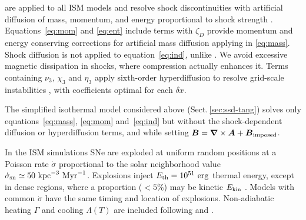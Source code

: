 \documentclass[preprint2]{aastex63}
\newcommand\SNr{\dot\sigma_{\rm sn}}
\newcommand\ESK{E_{\rm kin}}
\newcommand\EST{E_{\rm th}}
\newcommand{\vect}[1]{{{\mbox{\boldmath $#1$}}}}%
\newcommand\kpc{~ {\rm kpc}}
\newcommand\dx{ {\delta x}}
\newcommand\Myr{~ {\rm Myr}}
\newcommand\erg{~ {\rm erg}}
\newcommand{\fg}[1]{\textcolor{midgreen}{#1}}
\begin{document}
 \fg{are applied to all ISM models and} resolve shock
 discontinuities with artificial diffusion of mass, momentum, and energy
 proportional to shock strength \citep[see][for details]{GMKSH20}.
 \fg{Equations~\eqref{eq:mom} and \eqref{eq:ent} include terms with $\zeta_D$
 provide momentum and energy conserving corrections for artificial mass
 diffusion applying in \eqref{eq:mass}.}
 Shock diffusion is not applied to equation~\eqref{eq:ind}\fg{, unlike
 \citet{Gent:2013b}. We avoid excessive magnetic dissipation in
 shocks, where compression actually enhances it.}
 Terms containing $\nu_3,\,\chi_3$ and $\eta_3$ apply sixth-order hyperdiffusion
 to resolve grid-scale instabilities \citep[see, e.g.,][]{ABGS02,HB04}, \fg{
 with coefficients optimal for each $\dx$}.

 \fg{The simplified isothermal model considered above
 (Sect.\,\ref{sec:ssd-tang}) solves only
 equations~\fg{\eqref{eq:mass},} \eqref{eq:mom} and~\eqref{eq:ind} but 
 without the
 shock-dependent diffusion or hyperdiffusion terms, and while setting
 $\vect{B}=\vect\nabla\times\vect{A}+\vect{B}_{\rm imposed}$.}

 \fg{In the ISM simulations} SNe are exploded at \fg{uniform} random positions
 at a Poisson rate $\dot\sigma$ \fg{proportional to} the solar neighborhood
 value $\SNr\simeq 50\kpc^{-3}\Myr^{-1}$.
 Explosions inject $\EST = 10^{51}\erg$ thermal energy, except in
 dense regions, where a proportion \fg{($<5\%$) may be} kinetic $\ESK$ 
 \citep[see][]{GMKSH20}.
 \fg{Models with common $\dot\sigma$ have the same timing and location of
 explosions.}
 Non-adiabatic heating $\Gamma$ and cooling $\Lambda (T)$ are included
 \citep{Gent:2013a} following \citet{Wolfire:1995} and \citet{Sarazin:1987}.
\end{document}
